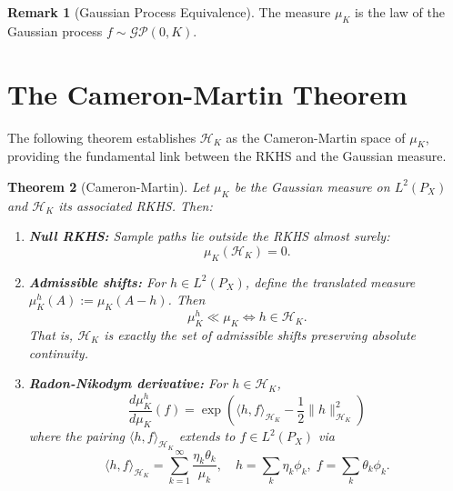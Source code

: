 \documentclass[11pt]{article}
\newtheorem{theorem}{Theorem}[section]
\theoremstyle{definition}
\newtheorem{remark}[theorem]{Remark}
\newcommand{\HK}{\mathcal{H}_K}
\newcommand{\inprod}[2]{\langle #1, #2 \rangle}
\newcommand{\norm}[1]{\| #1 \|}
\begin{document}
\begin{remark}[Gaussian Process Equivalence]
The measure $\mu_K$ is the law of the Gaussian process $f \sim \mathcal{GP}(0, K)$.
\end{remark}

\section{The Cameron-Martin Theorem}

The following theorem establishes $\HK$ as the Cameron-Martin space of $\mu_K$, providing the fundamental link between the RKHS and the Gaussian measure.

\begin{theorem}[Cameron-Martin]
\label{thm:cameron-martin}
Let $\mu_K$ be the Gaussian measure on $L^2(P_X)$ and $\HK$ its associated RKHS. Then:

\begin{enumerate}[label=(\roman*)]
    \item \textbf{Null RKHS:} Sample paths lie outside the RKHS almost surely:
    \begin{equation}
        \mu_K(\HK) = 0.
    \end{equation}
    
    \item \textbf{Admissible shifts:} For $h \in L^2(P_X)$, define the translated measure $\mu_K^h(A) := \mu_K(A - h)$. Then
    \begin{equation}
        \mu_K^h \ll \mu_K \iff h \in \HK.
    \end{equation}
    That is, $\HK$ is exactly the set of admissible shifts preserving absolute continuity.
    
    \item \textbf{Radon-Nikodym derivative:} For $h \in \HK$,
    \begin{equation}
        \boxed{
        \frac{d\mu_K^h}{d\mu_K}(f) = \exp\left( \inprod{h}{f}_{\HK} - \frac{1}{2}\norm{h}_{\HK}^2 \right)
        }
    \end{equation}
    where the pairing $\inprod{h}{f}_{\HK}$ extends to $f \in L^2(P_X)$ via
    \begin{equation}
        \inprod{h}{f}_{\HK} = \sum_{k=1}^\infty \frac{\eta_k \theta_k}{\mu_k}, \quad h = \sum_k \eta_k \phi_k, \; f = \sum_k \theta_k \phi_k.
    \end{equation}
\end{enumerate}
\end{theorem}
\end{document}
